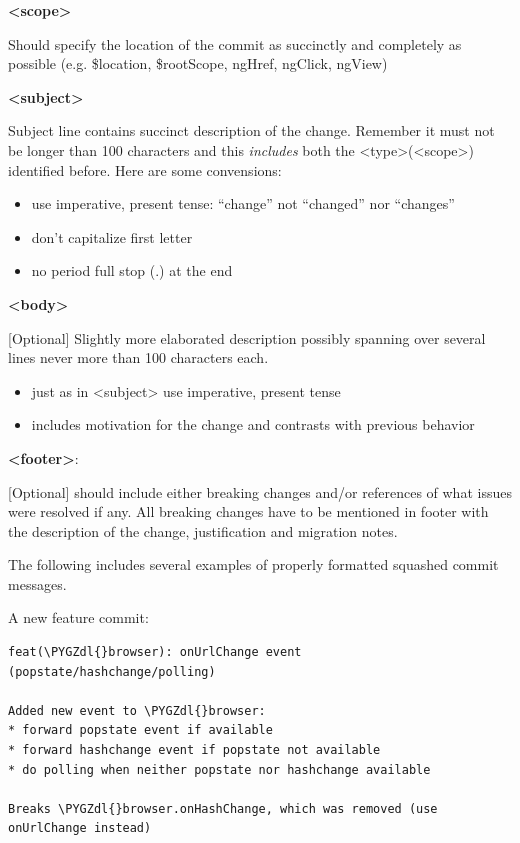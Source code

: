 \documentclass[letterpaper,10pt,english]{sphinxmanual}
\def\PYGZdl{\char`\$}
\begin{document}
\textbf{\textless{}scope\textgreater{}}

Should specify the location of the commit as succinctly and completely
as possible (e.g. \$location, \$rootScope, ngHref, ngClick, ngView)

\textbf{\textless{}subject\textgreater{}}

Subject line contains succinct description of the change. Remember it
must not be longer than 100 characters and this \emph{includes} both the
\textless{}type\textgreater{}(\textless{}scope\textgreater{}) identified before. Here are some convensions:
\begin{itemize}
\item {} 
use imperative, present tense: ``change'' not “changed” nor “changes”

\item {} 
don't capitalize first letter

\item {} 
no period full stop (.) at the end

\end{itemize}

\textbf{\textless{}body\textgreater{}}

{[}Optional{]} Slightly more elaborated description possibly spanning over several
lines never more than 100 characters each.
\begin{itemize}
\item {} 
just as in \textless{}subject\textgreater{} use imperative, present tense

\item {} 
includes motivation for the change and contrasts with previous behavior

\end{itemize}

\textbf{\textless{}footer\textgreater{}}:

{[}Optional{]} should include either breaking changes and/or references of
what issues were resolved if any. All breaking changes have to be
mentioned in footer with the description of the change, justification
and migration notes.

The following includes several examples of properly formatted squashed
commit messages.

A new feature commit:

\begin{Verbatim}[commandchars=\\\{\}]
feat(\PYGZdl{}browser): onUrlChange event (popstate/hashchange/polling)

Added new event to \PYGZdl{}browser:
* forward popstate event if available
* forward hashchange event if popstate not available
* do polling when neither popstate nor hashchange available

Breaks \PYGZdl{}browser.onHashChange, which was removed (use onUrlChange instead)
\end{Verbatim}
\end{document}
